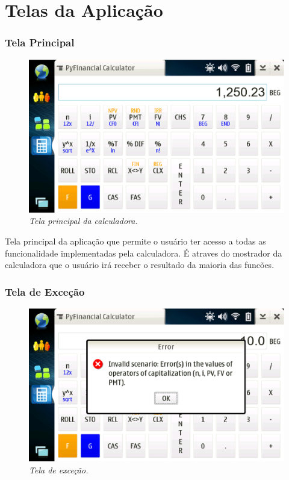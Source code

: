 \chapter{Telas da Aplicação}

\subsection{Tela Principal}

\begin{figure}[!h]
 \includegraphics[scale=0.55]{tela_principal.eps}
 \caption{\it Tela principal da calculadora.} \label{tab:tela_principal}
\end{figure}

Tela principal da aplicação que permite o usuário ter acesso a todas as funcionalidade
implementadas pela calculadora. É atraves do mostrador da calculadora que o usuário irá
receber o resultado da maioria das funcões.


\subsection{Tela de Exceção}

\begin{figure}[!h]
 \includegraphics[scale=0.55]{tela_error.eps}
 \caption{\it Tela de exceção.} \label{tab:tela_error}
\end{figure}

